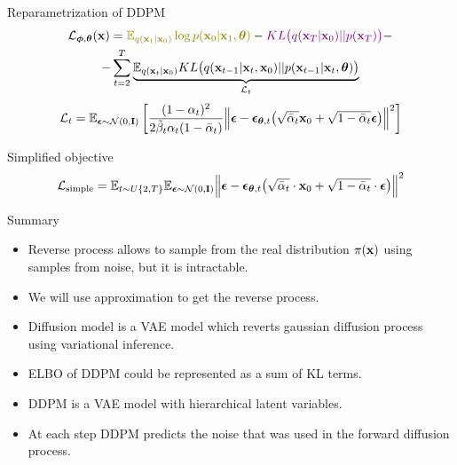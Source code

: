 \begin{frame}{Reparametrization of DDPM}
	\begin{multline*}
		\cL_{\bphi, \btheta}(\bx) =  {\color{olive}\bbE_{q(\bx_1 | \bx_0)} \log p(\bx_0 | \bx_1, \btheta)} - {\color{violet}KL\bigl(q(\bx_T | \bx_0) || p(\bx_T)\bigr)} - \\
		- \sum_{t=2}^T \underbrace{ \bbE_{q(\bx_t | \bx_0)} KL \bigl(q(\bx_{t-1} | \bx_t, \bx_0) || p(\bx_{t - 1} | \bx_t, \btheta )\bigr)}_{\cL_t}
	\end{multline*}
	\vspace{-0.3cm}
	\[
		\mathcal{L}_t  = \mathbb{E}_{\boldsymbol{\epsilon} \sim \mathcal{N}(0, \mathbf{I})} \left[ \frac{(1 - \alpha_t)^2}{2\tilde{\beta}_t \alpha_t (1 - \bar{\alpha}_t)} \Bigl\| \boldsymbol{\epsilon} - \boldsymbol{\epsilon}_{\boldsymbol{\theta}, t}\bigl( \sqrt{\bar{\alpha}_t} \mathbf{x}_0 + \sqrt{1 - \bar{\alpha}_t} \boldsymbol{\epsilon}\bigr) \Bigr\|^2 \right]
	\]
	\begin{block}{Simplified objective}
		\[
			 \mathcal{L}_{\text{simple}} = \mathbb{E}_{t \sim U\{2, T\}} \mathbb{E}_{\boldsymbol{\epsilon} \sim \mathcal{N}(0, \mathbf{I})} \Bigl\| \boldsymbol{\epsilon} - \boldsymbol{\epsilon}_{\boldsymbol{\theta}, t}\bigl( \sqrt{\bar{\alpha}_t} \cdot \mathbf{x}_0 + \sqrt{1 - \bar{\alpha}_t} \cdot \boldsymbol{\epsilon}\bigr) \Bigr\|^2 
		\]
	\end{block}
	\end{frame}
\begin{frame}{Summary}
	\begin{itemize}
		\item Reverse process allows to sample from the real distribution $\pi(\mathbf{x})$ using samples from noise, but it is intractable.
		\vfill
		\item We will use approximation to get the reverse process.		
		\vfill
		\item Diffusion model is a VAE model which reverts gaussian diffusion process using variational inference.
		\vfill
		\item ELBO of DDPM could be represented as a sum of KL terms.
		\vfill
		\item DDPM is a VAE model with hierarchical latent variables.
		\vfill
		\item At each step DDPM predicts the noise that was used in the forward diffusion process.
	\end{itemize}
\end{frame}
 